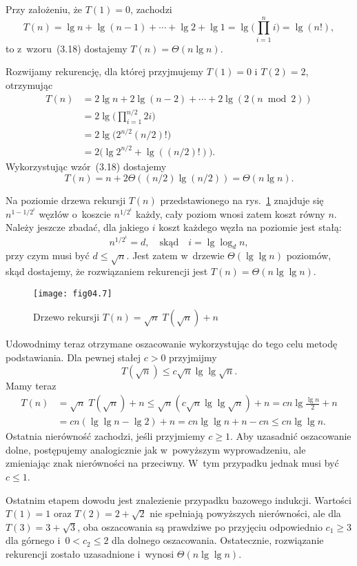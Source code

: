 \subproblem %
Przy założeniu, że $T(1)=0$, zachodzi
\[
	T(n) = \lg n+\lg(n-1)+\cdots+\lg2+\lg 1 = \lg\biggl(\prod_{i=1}^ni\biggr) = \lg(n!),
\]
to z~wzoru~(3.18) dostajemy $T(n)=\Theta(n\lg n)$.

\subproblem %
Rozwijamy rekurencję, dla której przyjmujemy $T(1)=0$ i $T(2)=2$, otrzymując
\begin{align*}
	T(n) &= 2\lg n+2\lg(n-2)+\cdots+2\lg(2(n\bmod2)) \\
	&= 2\lg\biggl(\prod_{i=1}^{n/2}2i\biggr) \\
	&= 2\lg\bigl(2^{n/2}(n/2)!\bigr) \\
	&= 2\bigl(\lg 2^{n/2}+\lg((n/2)!)\bigr).
\end{align*}
Wykorzystując wzór~(3.18) dostajemy
\[
	T(n) = n+2\Theta((n/2)\lg (n/2)) = \Theta(n\lg n).
\]

\subproblem %
Na  poziomie drzewa rekursji $T(n)$ przedstawionego na rys.~\ref{fig:4-4j} znajduje się $n^{1-1/2^i}$ węzłów o~koszcie $n^{1/2^i}$ każdy, cały poziom wnosi zatem koszt równy $n$. Należy jeszcze zbadać, dla jakiego $i$ koszt każdego węzła na  poziomie jest stałą:
\[
	n^{1/2^i} = d, \quad\text{skąd}\quad i = \lg\log_dn,
\]
przy czym musi być $d\le\sqrt{n}$. Jest zatem w~drzewie $\Theta(\lg\lg n)$ poziomów, skąd dostajemy, że rozwiązaniem rekurencji jest $T(n)=\Theta(n\lg\lg n)$.
\begin{figure}[ht]
	\begin{center}
		\texttt{[image: fig04.7]}
	\caption{Drzewo rekursji $T(n)=\sqrt{n}\;T(\!\sqrt{n})+n$} \label{fig:4-4j}
	\end{center}
\end{figure}

Udowodnimy teraz otrzymane oszacowanie wykorzystując do tego celu metodę podstawiania. Dla pewnej stałej $c>0$ przyjmijmy
\[
    T(\!\sqrt{n}) \le c\sqrt{n}\lg\lg\sqrt{n}.
\]
Mamy teraz
\begin{align*}
    T(n) &= \sqrt{n}\;T(\!\sqrt{n})+n \le \sqrt{n}\left(c\sqrt{n}\lg\lg\sqrt{n}\right)+n = cn\lg\frac{\lg n}{2}+n \\[1mm]
	&= cn(\lg\lg n-\lg2)+n = cn\lg\lg n+n-cn \le cn\lg\lg n.
\end{align*}
Ostatnia nierówność zachodzi, jeśli przyjmiemy $c\ge1$. Aby uzasadnić oszacowanie dolne, postępujemy analogicznie jak w~powyższym wyprowadzeniu, ale zmieniając znak nierówności na przeciwny. W~tym przypadku jednak musi być $c\le1$.

Ostatnim etapem dowodu jest znalezienie przypadku bazowego indukcji. Wartości $T(1)=1$ oraz $T(2)=2+\sqrt{2}$ nie spełniają powyższych nierówności, ale dla $T(3)=3+\sqrt{3}$, oba oszacowania są prawdziwe po przyjęciu odpowiednio $c_1\ge3$ dla górnego i~$0<c_2\le2$ dla dolnego oszacowania. Ostatecznie, rozwiązanie rekurencji zostało uzasadnione i~wynosi $\Theta(n\lg\lg n)$.

